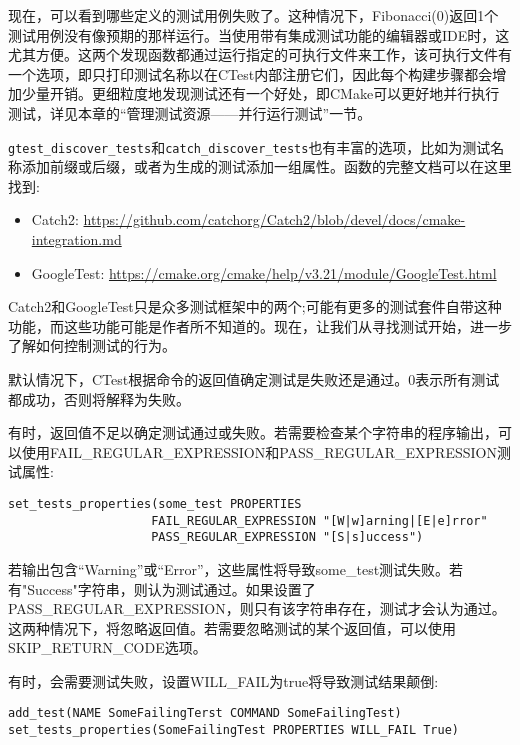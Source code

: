 现在，可以看到哪些定义的测试用例失败了。这种情况下，Fibonacci(0)返回1个测试用例没有像预期的那样运行。当使用带有集成测试功能的编辑器或IDE时，这尤其方便。这两个发现函数都通过运行指定的可执行文件来工作，该可执行文件有一个选项，即只打印测试名称以在CTest内部注册它们，因此每个构建步骤都会增加少量开销。更细粒度地发现测试还有一个好处，即CMake可以更好地并行执行测试，详见本章的“管理测试资源——并行运行测试”一节。

\texttt{gtest\_discover\_tests}和\texttt{catch\_discover\_tests}也有丰富的选项，比如为测试名称添加前缀或后缀，或者为生成的测试添加一组属性。函数的完整文档可以在这里找到:

\begin{itemize}
\item 
Catch2: \url{https://github.com/catchorg/Catch2/blob/devel/docs/cmake-integration.md}
	
\item 
GoogleTest: \url{https://cmake.org/cmake/help/v3.21/module/GoogleTest.html}
\end{itemize}

Catch2和GoogleTest只是众多测试框架中的两个;可能有更多的测试套件自带这种功能，而这些功能可能是作者所不知道的。现在，让我们从寻找测试开始，进一步了解如何控制测试的行为。

 
默认情况下，CTest根据命令的返回值确定测试是失败还是通过。0表示所有测试都成功，否则将解释为失败。

有时，返回值不足以确定测试通过或失败。若需要检查某个字符串的程序输出，可以使用FAIL\_REGULAR\_EXPRESSION和PASS\_REGULAR\_EXPRESSION测试属性:

\begin{lstlisting}[style=styleCMake]
set_tests_properties(some_test PROPERTIES
					FAIL_REGULAR_EXPRESSION "[W|w]arning|[E|e]rror"
					PASS_REGULAR_EXPRESSION "[S|s]uccess")
\end{lstlisting}

若输出包含“Warning”或“Error”，这些属性将导致some\_test测试失败。若有"Success"字符串，则认为测试通过。如果设置了PASS\_REGULAR\_EXPRESSION，则只有该字符串存在，测试才会认为通过。这两种情况下，将忽略返回值。若需要忽略测试的某个返回值，可以使用SKIP\_RETURN\_CODE选项。

有时，会需要测试失败，设置WILL\_FAIL为true将导致测试结果颠倒:

\begin{lstlisting}[style=styleCMake]
add_test(NAME SomeFailingTerst COMMAND SomeFailingTest)
set_tests_properties(SomeFailingTest PROPERTIES WILL_FAIL True)
\end{lstlisting}

